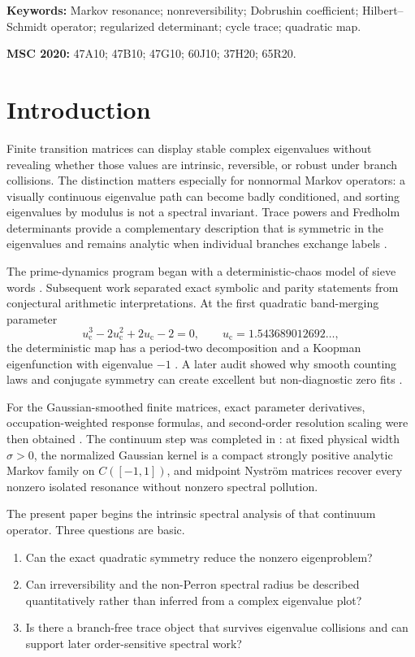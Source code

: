 \documentclass[11pt]{article}
\theoremstyle{definition}
\theoremstyle{remark}
\newcommand{\uc}{u_{\mathrm c}}
\begin{document}
\noindent\textbf{Keywords:} Markov resonance; nonreversibility; Dobrushin
coefficient; Hilbert--Schmidt operator; regularized determinant; cycle trace;
quadratic map.

\medskip
\noindent\textbf{MSC 2020:} 47A10; 47B10; 47G10; 60J10; 37H20; 65R20.

\section{Introduction}

Finite transition matrices can display stable complex eigenvalues without
revealing whether those values are intrinsic, reversible, or robust under
branch collisions.  The distinction matters especially for nonnormal Markov
operators: a visually continuous eigenvalue path can become badly
conditioned, and sorting eigenvalues by modulus is not a spectral invariant.
Trace powers and Fredholm determinants provide a complementary description
that is symmetric in the eigenvalues and remains analytic when individual
branches exchange labels \citep{Kato1995,Simon2005,Bornemann2010}.

The prime-dynamics program began with a deterministic-chaos model of sieve
words \citep{Wang2026Published}.  Subsequent work separated exact symbolic and
parity statements from conjectural arithmetic interpretations.  At the first
quadratic band-merging parameter
\begin{equation}\label{eq:uc}
 \uc^3-2\uc^2+2\uc-2=0,
 \qquad \uc=1.543689012692\ldots,
\end{equation}
the deterministic map has a period-two decomposition and a Koopman
eigenfunction with eigenvalue $-1$ \citep{WangParity2026}.  A later audit
showed why smooth counting laws and conjugate symmetry can create excellent
but non-diagnostic zero fits \citep{WangObstructions2026}.

For the Gaussian-smoothed finite matrices, exact parameter derivatives,
occupation-weighted response formulas, and second-order resolution scaling
were then obtained \citep{WangGaussianResponse2026}.  The continuum step was
completed in \citet{WangContinuum2026}: at fixed physical width $\sigma>0$,
the normalized Gaussian kernel is a compact strongly positive analytic
Markov family on $C([-1,1])$, and midpoint Nystr\"om matrices recover every
nonzero isolated resonance without nonzero spectral pollution.

The present paper begins the intrinsic spectral analysis of that continuum
operator.  Three questions are basic.
\begin{enumerate}[label=(\roman*),leftmargin=2.2em]
 \item Can the exact quadratic symmetry reduce the nonzero eigenproblem?
 \item Can irreversibility and the non-Perron spectral radius be described
 quantitatively rather than inferred from a complex eigenvalue plot?
 \item Is there a branch-free trace object that survives eigenvalue
 collisions and can support later order-sensitive spectral work?
\end{enumerate}
\end{document}
